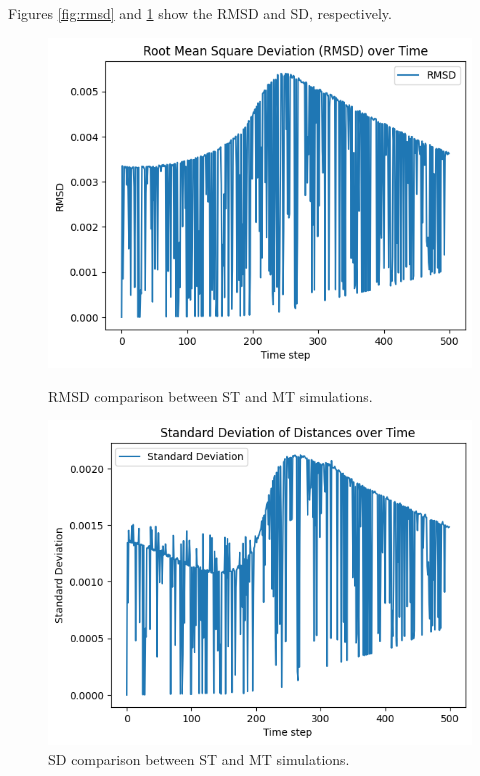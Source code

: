 \documentclass[english,11pt]{article}
\begin{document}
Figures \ref{fig:rmsd} and \ref{fig:std_dev} show the RMSD and SD, respectively.

\begin{figure}[h!]
    \centering
    \begin{minipage}{0.45\textwidth}
        \centering
        \includegraphics[width=\textwidth]{graph/RMSD.png}
        \caption{RMSD comparison between ST and MT simulations.}
        \label{fig:rmsd}
    \end{minipage}\hfill
    \begin{minipage}{0.45\textwidth}
        \centering
        \includegraphics[width=\textwidth]{graph/std_dev.png}
        \caption{SD comparison between ST and MT simulations.}
        \label{fig:std_dev}
    \end{minipage}
\end{figure}
\end{document}
